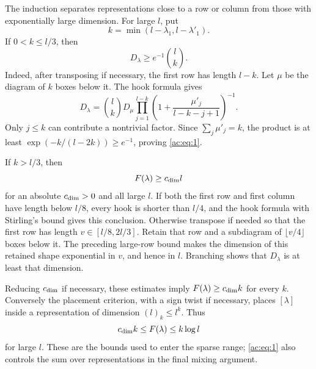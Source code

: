 The induction separates representations close to a row or column from
those with exponentially large dimension. For large \(l\), put
\[
 k=\min(l-\lambda_1,l-\lambda'_1).
\]
If \(0<k\le l/3\), then
\begin{equation}
 D_\lambda\ge e^{-1}\binom{l}{k}.
 \label{ac:eq:1}
\end{equation}
Indeed, after transposing if necessary, the first row has length \(l-k\).
Let \(\mu\) be the diagram of \(k\) boxes below it. The hook formula gives
\[
 D_\lambda
 =\binom{l}{k}D_\mu
   \prod_{j=1}^{l-k}
   \left(1+\frac{\mu'_j}{l-k-j+1}\right)^{-1}.
\]
Only \(j\le k\) can contribute a nontrivial factor. Since
\(\sum_j\mu'_j=k\), the product is at least
\(\exp(-k/(l-2k))\ge e^{-1}\), proving \eqref{ac:eq:1}.

If \(k>l/3\), then
\[
 F(\lambda)\ge c_{\rm dim}l
\]
for an absolute \(c_{\rm dim}>0\) and all large \(l\). If both the first
row and first column have length below \(l/8\), every hook is shorter
than \(l/4\), and the hook formula with Stirling's bound gives this
conclusion. Otherwise transpose if needed so that the first row has
length \(v\in[l/8,2l/3]\). Retain that row and a subdiagram of
\(\lfloor v/4\rfloor\) boxes below it. The preceding large-row bound
makes the dimension of this retained shape exponential in \(v\), and
hence in \(l\). Branching shows that \(D_\lambda\) is at least that
dimension.

Reducing \(c_{\rm dim}\) if necessary, these estimates imply
\(F(\lambda)\ge c_{\rm dim}k\) for every \(k\). Conversely the placement
criterion, with a sign twist if necessary, places \([\lambda]\) inside
a representation of dimension \((l)_k\le l^k\). Thus
\[
 c_{\rm dim}k\le F(\lambda)\le k\log l
\]
for large \(l\). These are the bounds used to enter the sparse range;
\eqref{ac:eq:1} also controls the sum over representations in the final
mixing argument.

